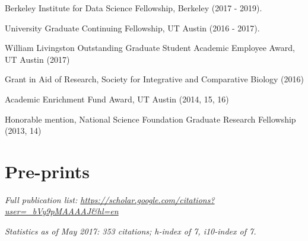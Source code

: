 \documentclass[margin,line]{resume}
\newenvironment{benumerate}[1]{
    \let\oldItem\item
    \def\item{\addtocounter{enumi}{-2}\oldItem}
    \begin{enumerate}
    \setcounter{enumi}{#1}
    \addtocounter{enumi}{1}
}{
    \end{enumerate}
}
\begin{document}
\begin{resume}
\begin{description}[leftmargin=0pt]  
\setlength{\itemsep}{3pt} 
\item[] Berkeley Institute for Data Science Fellowship, Berkeley (2017 - 2019).
\item[] University Graduate Continuing Fellowship, UT Austin (2016 - 2017).
\item[] William Livingston Outstanding Graduate Student Academic Employee Award, UT Austin (2017)
\item[] Grant in Aid of Research,  Society for Integrative and Comparative Biology (2016)
\item[] Academic Enrichment Fund Award, UT Austin (2014, 15, 16)
\item[] Honorable mention, National Science Foundation Graduate Research Fellowship (2013, 14)
\end{description}





 \section{\mysidestyle Pre-prints}
    
\begin{description}[leftmargin=0pt]  
\setlength{\itemsep}{2pt} 
\item[] {\em Full publication list: \url{https://scholar.google.com/citations?user=_bVy9pMAAAAJ&hl=en}}
\item[] {\em Statistics as of May 2017: 353 citations; h-index of 7, i10-index of 7.}
\item[]
\end{description}


\begin{benumerate}{18}
\setlength{\itemsep}{3pt}


\end{benumerate}
\end{resume}
\end{document}
